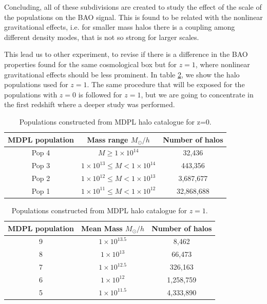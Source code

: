Concluding, all of these subdivisions are created to study the effect of the scale of the populations 
on the BAO signal. This is found to be related with the nonlinear gravitational effects, i.e.
for smaller mass halos there is a coupling among different density modes, that is not
so strong for larger scales. 

This lead us to other experiment, to revise if there is a difference in the BAO properties
found for the same cosmological box but for $z=1$, where nonlinear gravitational effects
should be less prominent. In table \ref{z1}, we show the halo populations used 
for $z=1$. The same procedure that will be exposed for the populations with $z=0$ is followed
for $z=1$, but we are going to concentrate in the first redshift where a deeper study 
was performed. 

\begin{table}
\begin{center}
  \begin{tabular}{ | c | c | c | }
    \hline \hline
    MDPL population & Mass range $M_{\odot}/h$& Number of halos \\ \hline \hline
    Pop 4 & $ M \geqslant 1\times 10^{14}$ & 32,436 \\ \hline
    Pop 3 & $ 1\times 10^{13} \leq M < 1\times 10^{14} $ & 443,356\\ \hline
    Pop 2 & $ 1\times 10^{12} \leq M < 1\times 10^{13}$ & 3,687,677\\ \hline
    Pop 1 & $ 1\times 10^{11} \leq M < 1\times 10^{12}$ & 32,868,688 \\ \hline
  \end{tabular}  
   \caption{ Populations constructed from MDPL halo catalogue for z=0. }
\label{pophalos}
\end{center}
\end{table}


\begin{table}
\begin{center}
  \begin{tabular}{ | c | c | c | }
    \hline \hline
    MDPL population & Mean Mass $M_{\odot}/h$& Number of halos \\ \hline \hline    
    9 & $ 1\times 10^{13.5}$ & 8,462\\ \hline
    8 & $ 1\times 10^{13}$ & 66,473 \\ \hline
    7 & $ 1\times 10^{12.5}$ & 326,163 \\ \hline
    6 & $ 1\times 10^{12}$ & 1,258,759 \\ \hline
    5 & $ 1\times 10^{11.5}$ & 4,333,890 \\ \hline
  \end{tabular}  
   \caption{ Populations constructed from MDPL halo catalogue for $z=1$. }
\label{z1}
\end{center}
\end{table}



